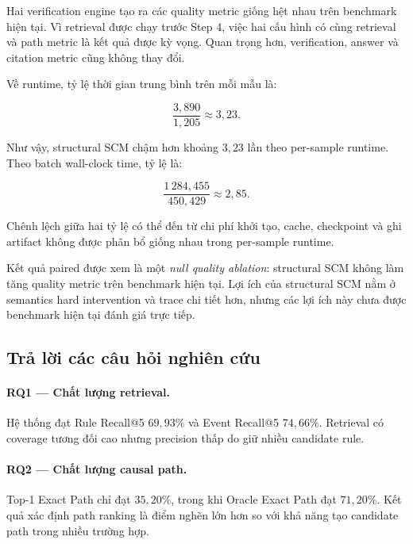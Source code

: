 Hai verification engine tạo ra các quality metric giống hệt nhau trên
benchmark hiện tại. Vì retrieval được chạy trước Step 4, việc hai cấu hình
có cùng retrieval và path metric là kết quả được kỳ vọng. Quan trọng hơn,
verification, answer và citation metric cũng không thay đổi.

Về runtime, tỷ lệ thời gian trung bình trên mỗi mẫu là:

\begin{equation}
\frac{
    3{,}890
}{
    1{,}205
}
\approx
3{,}23.
\end{equation}

Như vậy, structural SCM chậm hơn khoảng \(3{,}23\) lần theo per-sample
runtime. Theo batch wall-clock time, tỷ lệ là:

\begin{equation}
\frac{
    1\,284{,}455
}{
    450{,}429
}
\approx
2{,}85.
\end{equation}

Chênh lệch giữa hai tỷ lệ có thể đến từ chi phí khởi tạo, cache, checkpoint
và ghi artifact không được phân bổ giống nhau trong per-sample runtime.

Kết quả paired được xem là một \emph{null quality ablation}: structural SCM
không làm tăng quality metric trên benchmark hiện tại. Lợi ích của
structural SCM nằm ở semantics hard intervention và trace chi tiết hơn,
nhưng các lợi ích này chưa được benchmark hiện tại đánh giá trực tiếp.

\subsection{Trả lời các câu hỏi nghiên cứu}

\paragraph{RQ1 --- Chất lượng retrieval.}

Hệ thống đạt Rule Recall@5 \(69{,}93\%\) và Event Recall@5 \(74{,}66\%\).
Retrieval có coverage tương đối cao nhưng precision thấp do giữ nhiều
candidate rule.

\paragraph{RQ2 --- Chất lượng causal path.}

Top-1 Exact Path chỉ đạt \(35{,}20\%\), trong khi Oracle Exact Path đạt
\(71{,}20\%\). Kết quả xác định path ranking là điểm nghẽn lớn hơn so với
khả năng tạo candidate path trong nhiều trường hợp.

